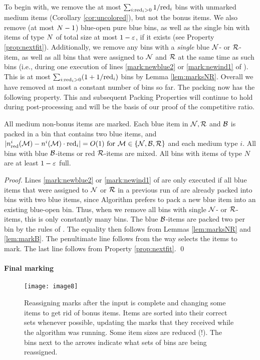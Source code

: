 To begin with, we remove the at most $\sum_{i: \mathrm{red}_i>0} 1/\mathrm{red}_i$ bins with unmarked medium items
(Corollary \ref{cor:uncolored}), but not the bonus items.
We also remove (at most $N-1$) blue-open pure blue bins,
as well as the single bin with items of type $N$ of total size at most $1-\varepsilon$, if it exists (see Property \ref{prop:nextfit}).
Additionally, we remove any bins with a \emph{single} blue $\mathcal{N}$- or $\mathcal{R}$-item, as well as all bins that were assigned to $\mathcal{N}$ and $\mathcal{R}$ at the same
time as such bins (i.e., during one execution of lines \ref{mark:newblue2} or \ref{mark:newind1} of {\MarkItems}).
This is at most $\sum_{i: \mathrm{red}_i>0} (1+1/\mathrm{red}_i)$ bins
by Lemma \ref{lem:marksNR}.
Overall we have removed at most a constant number of bins so far.
The packing now has the following property.
This and subsequent Packing Properties will continue to hold during post-processing and will be the basis of our proof of the competitive ratio.

\begin{pproperty}
\label{pp:twoblue}
All medium non-bonus items are marked.
Each blue item in $\mathcal{N},\mathcal{R}$ and $\mathcal{B}$ is packed in a bin that contains two blue items,
and $|n_{\mathrm{red}}^i(\mathcal{M}) - n^i(\mathcal{M})\cdot \mathrm{red}_i  | = O(1)\mbox{ for }\mathcal{M}\in\{\mathcal{N}, \mathcal{B}, \mathcal{R}\}$ and 
each medium type $i$.
All bins with blue $\mathcal{B}$-items or red $\mathcal{R}$-items are mixed. 
All bins with items of type $N$ are at least $1-\varepsilon$ full.
\end{pproperty}
\begin{proof}
Lines \ref{mark:newblue2} or \ref{mark:newind1} of {\MarkItems} are only executed if all blue items that were
assigned to $\mathcal{N}$ or $\mathcal{R}$ in a previous run of {\MarkItems}
are already packed into bins with two blue items, since 
Algorithm {\Pack} prefers to pack a new blue item into an existing blue-open bin.
Thus, when we remove all bins with single $\mathcal{N}$- or $\mathcal{R}$-items, this is only constantly many bins.
The blue $\mathcal{B}$-items are packed two per bin by the rules of \MarkItems.
The equality then follows from Lemmas \ref{lem:marksNR} and \ref{lem:markB}. 
The penultimate line follows from the way {\MarkItems} selects the items to mark. The last line follows from Property \ref{prop:nextfit}.
\qed\end{proof}


\paragraph{Final marking}
\label{sec:final}

\begin{figure}[t!]
	\begin{center}
		\texttt{[image: image8]}
		\caption{\label{fig:final}Reassigning marks after the input is complete and changing some items to get rid of bonus items.
		Items are sorted into their correct sets whenever possible, updating the marks
		that they received while the algorithm was running. Some item sizes are reduced (!).
		The bins next to the arrows indicate what sets of bins are being reassigned.
		}
	\end{center}
\end{figure}

